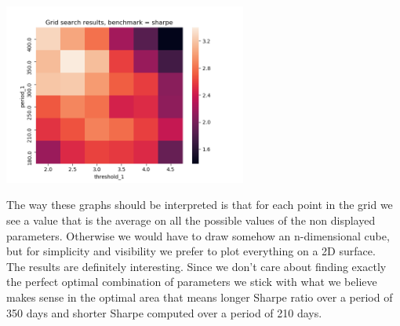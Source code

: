 \begin{center}
	\centering
	\includegraphics[width=0.6\textwidth]{GridSearches/Sharpe_Basic/Figure_5.png}
	\label{Sharpe_Ranking_2}
\end{center}

The way these graphs should be interpreted is that for each point in the grid we see a value that is the average on all the possible values of the non displayed parameters. Otherwise we would have to draw somehow an n-dimensional cube, but for simplicity and visibility we prefer to plot everything on a 2D surface.\\

The results are definitely interesting. Since we don't care about finding exactly the perfect optimal combination of parameters we stick with what we believe makes sense in the optimal area that means longer Sharpe ratio over a period of 350 days and shorter Sharpe computed over a period of 210 days.